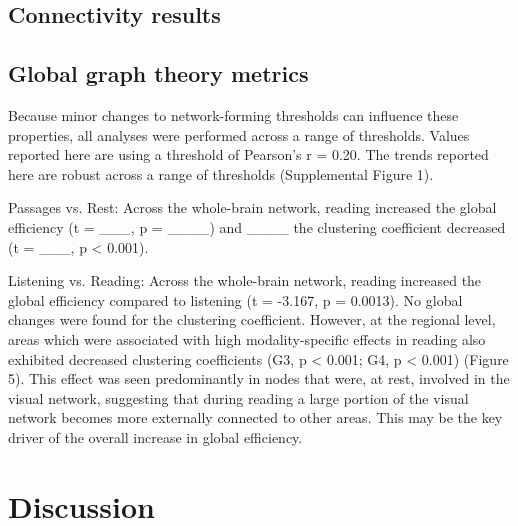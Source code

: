 \subsection{Connectivity results}




\subsection{Global graph theory metrics}
Because minor changes to network-forming thresholds can influence these properties, all analyses were performed across a range of thresholds. Values reported here are using a threshold of Pearson’s r = 0.20. The trends reported here are robust across a range of thresholds (Supplemental Figure 1). 

Passages vs. Rest: Across the whole-brain network, reading increased the global efficiency (t = ___, p = ____) and ____ the clustering coefficient decreased (t = ___, p < 0.001).

Listening vs. Reading: Across the whole-brain network, reading increased the global efficiency compared to listening (t = -3.167, p = 0.0013). No global changes were found for the clustering coefficient. However, at the regional level, areas which were associated with high modality-specific effects in reading also exhibited decreased clustering coefficients (G3, p < 0.001; G4, p < 0.001) (Figure 5). This effect was seen predominantly in nodes that were, at rest, involved in the visual network, suggesting that during reading a large portion of the visual network becomes more externally connected to other areas. This may be the key driver of the overall increase in global efficiency.



\section{Discussion}